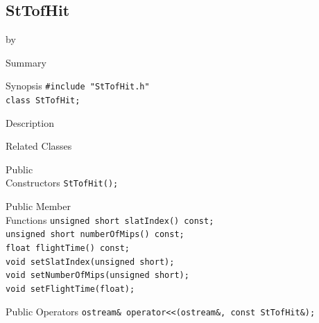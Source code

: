 \documentclass[twoside]{article}
\newcommand{\entrylabel}[1]{\mbox{\textbf{{#1}}}\hfil}%
\newenvironment{entry}
{\begin{list}{}%
    {\renewcommand{\makelabel}{\entrylabel}%
     \setlength{\labelwidth}{90pt}%
     \setlength{\leftmargin}{\labelwidth}
     \advance\leftmargin by \labelsep%
      }%
    }%
  {\end{list}}
\newcommand{\Entrylabel}[1]%
{\raisebox{0pt}[1ex][0pt]{\makebox[\labelwidth][l]%
    {\parbox[t]{\labelwidth}{\hspace{0pt}\textbf{{#1}}}}}}
\newenvironment{Entry}%
{\renewcommand{\entrylabel}{\Entrylabel}\begin{entry}}%
  {\end{entry}}
\begin{document}
\subsection{StTofHit}
\label{sec:StTofHit}
\begin{Entry}
\item[Summary]
\item[Synopsis]
    \verb+#include "StTofHit.h"+\\
    \verb+class StTofHit;+\\
\item[Description]
\item[Related Classes]
\item[Public\\ Constructors]
    \verb+StTofHit();+\\
\item[Public Member\\ Functions]
    \verb+unsigned short slatIndex() const;+\\
    \verb+unsigned short numberOfMips() const;+\\
    \verb+float flightTime() const;+\\
    \verb+void setSlatIndex(unsigned short);+\\
    \verb+void setNumberOfMips(unsigned short);+\\
    \verb+void setFlightTime(float);+\\
\item[Public Operators]
    \verb+ostream& operator<<(ostream&, const StTofHit&);+\\
\end{Entry}
\clearpage
\end{document}
